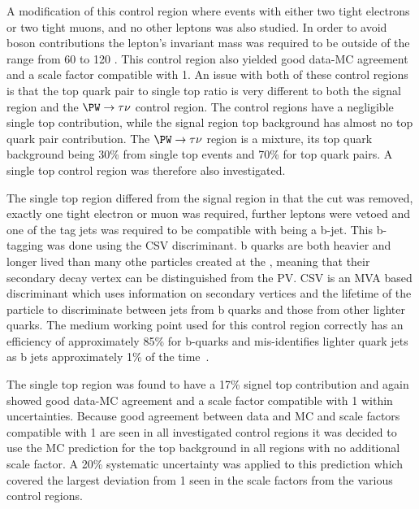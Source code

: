 A modification of this control region where events with either two tight electrons or two tight muons, and no other leptons was also studied. In order to avoid \PZ boson contributions the lepton's invariant mass was required to be outside of the range from 60 to 120 \GeV. This control region also yielded good data-\ac{MC} agreement and a scale factor compatible with 1. An issue with both of these control regions is that the top quark pair to single top ratio is very different to both the signal region and the $\PW\rightarrow\tau\nu$ control region. The control regions have a negligible single top contribution, while the signal region top background has almost no top quark pair contribution. The $\PW\rightarrow\tau\nu$ region is a mixture, its top quark background being 30\% from single top events and 70\% for top quark pairs. A single top control region was therefore also investigated.

The single top region differed from the signal region in that the \jetmetdphi cut was removed, exactly one tight electron or muon was required, further leptons were vetoed and one of the tag jets was required to be compatible with being a b-jet. This b-tagging was done using the \ac{CSV} discriminant. b quarks are both heavier and longer lived than many othe particles created at the \LHC, meaning that their secondary decay vertex can be distinguished from the \ac{PV}. \ac{CSV} is an \ac{MVA} based discriminant which uses information on secondary vertices and the lifetime of the particle to discriminate between jets from b quarks and those from other lighter quarks. The medium working point used for this control region correctly has an efficiency of approximately 85\% for b-quarks and mis-identifies lighter quark jets as b jets approximately 1\% of the time~\cite{bjets}.

The single top region was found to have a 17\% signel top contribution and again showed good data-\ac{MC} agreement and a scale factor compatible with 1 within uncertainties. Because good agreement between data and \ac{MC} and scale factors compatible with 1 are seen in all investigated control regions it was decided to use the \ac{MC} prediction for the top background in all regions with no additional scale factor. A 20\% systematic uncertainty was applied to this prediction which covered the largest deviation from 1 seen in the scale factors from the various control regions.

